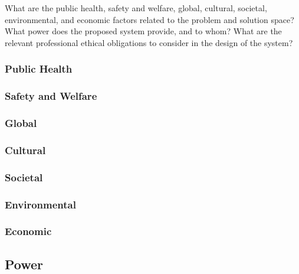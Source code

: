 



What are the public health, safety and welfare, global, cultural, societal, environmental, 
and economic factors related to the problem and solution space? What power does the proposed system 
provide, and to whom? What are the relevant professional ethical obligations to consider in the design 
of the system?

\subsubsection{Public Health}

\subsubsection{Safety and Welfare}

\subsubsection{Global}

\subsubsection{Cultural}

\subsubsection{Societal}

\subsubsection{Environmental}

\subsubsection{Economic}

\subsection{Power}